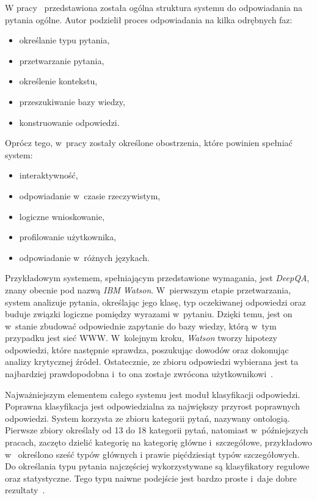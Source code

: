W pracy~\cite{lapshin2012question} przedstawiona została ogólna struktura systemu do odpowiadania na pytania ogólne. Autor podzielił proces odpowiadania na kilka odrębnych faz:
\begin{itemize}
	\item określanie typu pytania,
	\item przetwarzanie pytania,
	\item określenie kontekstu,
	\item przeszukiwanie bazy wiedzy,
	\item konstruowanie odpowiedzi.
\end{itemize}

Oprócz tego, w~pracy zostały określone obostrzenia, które powinien spełniać system:
\begin{itemize}
	\item interaktywność,
	\item odpowiadanie w~czasie rzeczywistym,
	\item logiczne wnioskowanie,
	\item profilowanie użytkownika,
	\item odpowiadanie w~różnych językach.
\end{itemize}

Przykładowym systemem, spełniającym przedstawione wymagania, jest \emph{DeepQA}, znany obecnie pod nazwą \emph{IBM Watson}. W~pierwszym etapie przetwarzania, system analizuje pytania, określając jego klasę, typ oczekiwanej odpowiedzi oraz buduje związki logiczne pomiędzy wyrazami w~pytaniu. Dzięki temu, jest on w~stanie zbudować odpowiednie zapytanie do bazy wiedzy, którą w~tym przypadku jest sieć WWW. W~kolejnym kroku, \emph{Watson} tworzy hipotezy odpowiedzi, które następnie sprawdza, poszukując dowodów oraz dokonując analizy krytycznej źródeł. Ostatecznie, ze zbioru odpowiedzi wybierana jest ta najbardziej prawdopodobna i~to ona zostaje zwrócona użytkownikowi~\cite{lapshin2012question}.

Najważniejszym elementem całego systemu jest moduł klasyfikacji odpowiedzi. Poprawna klasyfikacja jest odpowiedzialna za największy przyrost poprawnych odpowiedzi. System korzysta ze zbioru kategorii pytań, nazywany ontologią. Pierwsze zbiory określały od 13 do 18 kategorii pytań, natomiast w~późniejszych pracach, zaczęto dzielić kategorię na kategorię główne i~szczegółowe, przykładowo w~\cite{li2002learning} określono sześć typów głównych i prawie pięćdziesiąt typów szczegółowych. Do określania typu pytania najczęściej wykorzystywane są klasyfikatory regułowe oraz statystyczne. Tego typu naiwne podejście jest bardzo proste i~daje dobre rezultaty~\cite{lapshin2012question}.

